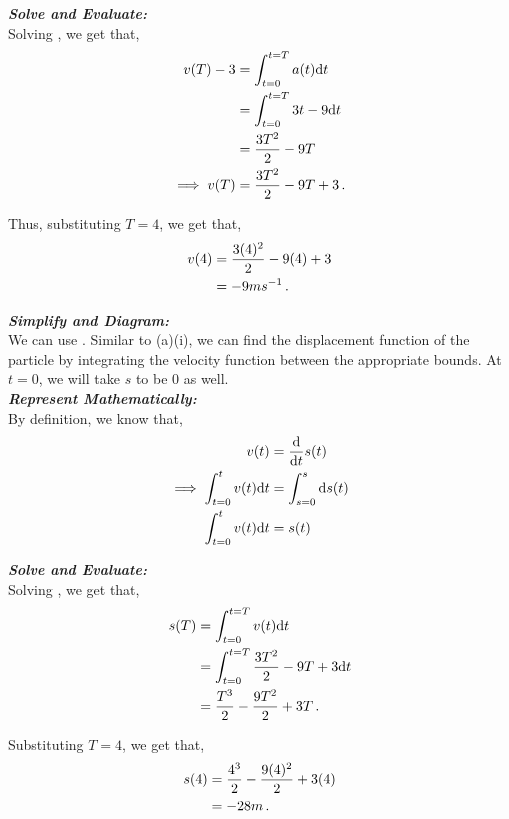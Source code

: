 \begin{subquestions}
\begin{subsubquestions}
\textbf{\textit{Solve and Evaluate:}} \\
Solving , we get that,
\begin{align}
	v(T)-3 & = \int_{t=0}^{t=T}a(t)\mathrm{d} t \nonumber \\
	     & = \int_{t=0}^{t=T} 3t-9 \mathrm{d} t \nonumber \\
	     & = \frac{3T^2}{2}-9T \nonumber \\
\implies v(T) & = \frac{3T^2}{2}-9T +3 \,.
\end{align}

Thus, substituting $T=4$, we get that,
\begin{align}
	v(4) & = \frac{3(4)^2}{2}-9(4) +3 \nonumber \\
	     & = -9ms^{-1} \,.
\end{align}



\subsubquestion

\textbf{\textit{Simplify and Diagram:}} \\
We can use . Similar to (a)(i), we can find the displacement function of the particle by integrating the velocity function between the appropriate bounds. At $t=0$, we will take $s$ to be $0$ as well. \\




\textbf{\textit{Represent Mathematically:}} \\
By definition, we know that,
\begin{align}
	v(t) & = \frac{\mathrm{d}}{\mathrm{d}t}s(t) \nonumber \\
	\implies \int_{t=0}^{t}v(t)\mathrm{d} t & = \int_{s=0}^{s} \mathrm{d} s(t) \nonumber \\
	\int_{t=0}^{t}v(t)\mathrm{d} t & = s(t)  \label{2009:q6:SEqn1}
\end{align}




\textbf{\textit{Solve and Evaluate:}} \\
Solving , we get that,
\begin{align}
	s(T) & = \int_{t=0}^{t=T} v(t)\mathrm{d} t \nonumber \\
	      & = \int_{t=0}^{t=T} \frac{3T^2}{2}-9T +3 \mathrm{d} t \nonumber \\
	      & = \frac{T^3}{2} - \frac{9T^2}{2} + 3T \,.
\end{align}

Substituting $T=4$, we get that,
\begin{align}
	s(4) & = \frac{4^3}{2} - \frac{9(4)^2}{2} + 3(4) \nonumber \\
	     & = -28m\,.
\end{align}
	

\end{subsubquestions}
\end{subquestions}
